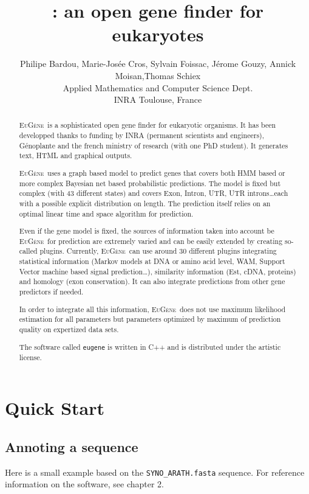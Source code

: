 \documentclass[a4paper,titlepage]{report}
\author{Philipe Bardou, Marie-Jos\'ee Cros, Sylvain Foissac, J\'erome Gouzy, Annick Moisan,Thomas Schiex \\ Applied Mathematics and Computer Science Dept.\\ INRA Toulouse, France}
\title{\EuGene: an open gene finder for eukaryotes}
\newcommand{\EuGene}{\textsc{EuG\`ene}}
\begin{document}
\maketitle
\tableofcontents

\begin{abstract}
  \EuGene\ is a sophisticated open gene finder for eukaryotic
  organisms. It has been developped thanks to funding by INRA
  (permanent scientists and engineers), G\'enoplante and the french
  ministry of research (with one PhD student). It generates text, HTML and graphical outputs.
  
  \EuGene\ uses a graph based model to predict genes that covers both
  HMM based or more complex Bayesian net based probabilistic
  predictions. The model is fixed but complex (with 43 different
  states) and covers Exon, Intron, UTR, UTR introns\ldots each with a possible explicit
  distribution on length. The prediction itself relies on an optimal
  linear time and space algorithm for prediction.
  
  Even if the gene model is fixed, the sources of information taken
  into account be \EuGene\ for prediction are extremely varied and can
  be easily extended by creating so-called plugins. Currently,
  \EuGene\ can use around 30 different plugins integrating statistical
  information (Markov models at DNA or amino acid level, WAM, Support
  Vector machine based signal prediction\ldots), similarity information
  (Est, cDNA, proteins) and homology (exon conservation). It can also
  integrate predictions from other gene predictors if needed.
  
  In order to integrate all this information, \EuGene\ does not use
  maximum likelihood estimation for all parameters but parameters
  optimized by maximum of prediction quality on expertized data sets.

  The software called \texttt{eugene} is written in C++ and is distributed 
  under the artistic license.
 \end{abstract}

\chapter{Quick Start}

\section{Annoting a sequence}
Here is a small example based on the \texttt{SYNO\_ARATH.fasta} sequence.
For reference information on the software, see chapter 2.
\end{document}

